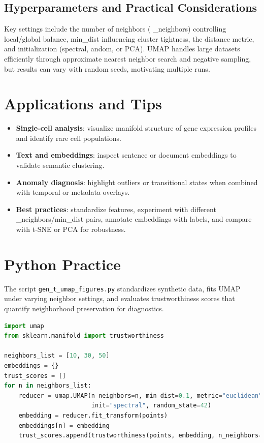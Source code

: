 ﻿\documentclass[12pt]{article}
\begin{document}
\subsection{Hyperparameters and Practical Considerations}
Key settings include the number of neighbors (
_neighbors) controlling local/global balance, min_dist influencing cluster tightness, the distance metric, and initialization (spectral, 
andom, or PCA). UMAP handles large datasets efficiently through approximate nearest neighbor search and negative sampling, but results can vary with random seeds, motivating multiple runs.

\section{Applications and Tips}
\begin{itemize}
  \item \textbf{Single-cell analysis}: visualize manifold structure of gene expression profiles and identify rare cell populations.
  \item \textbf{Text and embeddings}: inspect sentence or document embeddings to validate semantic clustering.
  \item \textbf{Anomaly diagnosis}: highlight outliers or transitional states when combined with temporal or metadata overlays.
  \item \textbf{Best practices}: standardize features, experiment with different 
_neighbors/min_dist pairs, annotate embeddings with labels, and compare with t-SNE or PCA for robustness.
\end{itemize}

\section{Python Practice}
The script \texttt{gen\_t\_umap\_figures.py} standardizes synthetic data, fits UMAP under varying neighbor settings, and evaluates trustworthiness scores that quantify neighborhood preservation for diagnostics.
\begin{lstlisting}[language=Python,caption={Excerpt from gen_t_umap_figures.py}]
import umap
from sklearn.manifold import trustworthiness

neighbors_list = [10, 30, 50]
embeddings = {}
trust_scores = []
for n in neighbors_list:
    reducer = umap.UMAP(n_neighbors=n, min_dist=0.1, metric="euclidean",
                        init="spectral", random_state=42)
    embedding = reducer.fit_transform(points)
    embeddings[n] = embedding
    trust_scores.append(trustworthiness(points, embedding, n_neighbors=15))
\end{lstlisting}
\end{document}
